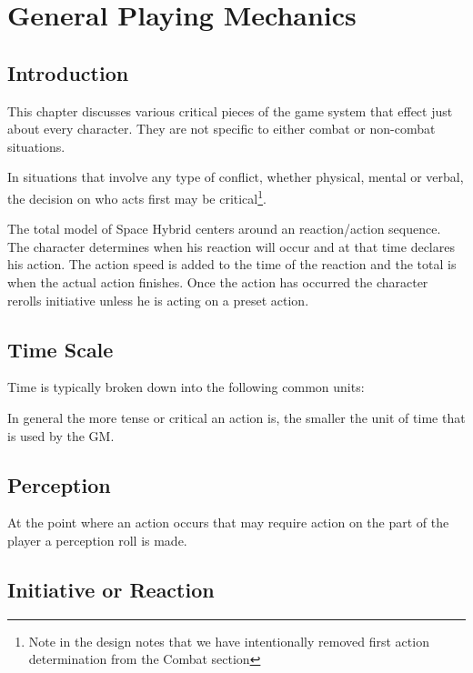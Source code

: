 \chapter{General Playing Mechanics}

\section{Introduction}

This chapter discusses various critical pieces of the game system that 
effect just about every character. They are not specific to either 
combat or non-combat situations. 

In situations that involve any type of conflict, whether physical, 
mental or verbal, the decision on who acts first may be 
critical\footnote{ Note in the design notes that we have intentionally 
removed first action determination from the Combat section}.

The total model of Space Hybrid centers around an reaction/action sequence.
The character determines when his reaction will occur and at that time 
declares his action. The action speed is added to the time of the reaction 
and the total is when the actual action finishes. Once the action has 
occurred the character rerolls initiative unless he is acting on a
preset action. 

\section{Time Scale}

Time is typically broken down into the following common units:



In general the more tense or critical an action is, the smaller the unit
of time that is used by the GM. 

\section{Perception}

At the point where an action occurs that may require action on the part
of the player a perception roll is made.

\section{Initiative or Reaction}

